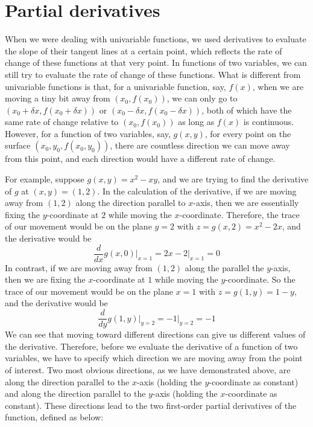 \section{Partial derivatives}
When we were dealing with univariable functions, we used derivatives to evaluate the slope of their tangent lines at a certain point, which reflects the rate of change of these functions at that very point.  In functions of two variables, we can still try to evaluate the rate of change of these functions.  What is different from univariable functions is that, for a univariable function, say, $f(x)$, when we are moving a tiny bit away from $(x_0, f(x_0))$, we can only go to $(x_0 + \delta x, f(x_0+ \delta x))$ or $(x_0 - \delta x, f(x_0 - \delta x))$, both of which have the same rate of change relative to $(x_0, f(x_0))$ as long as $f(x)$ is continuous.  However, for a function of two variables, say, $g(x,y)$, for every point on the surface $(x_0, y_0, f(x_0, y_0))$, there are countless direction we can move away from this point, and each direction would have a different rate of change.  

For example, suppose $g(x,y) = x^2 - xy$, and we are trying to find the derivative of $g$ at $(x,y) = (1,2)$.  In the calculation of the derivative, if we are moving away from $(1,2)$ along the direction parallel to $x$-axis, then we are essentially fixing the $y$-coordinate at $2$ while moving the $x$-coordinate.  Therefore, the trace of our movement would be on the plane $y=2$ with $z = g(x,2) = x^2 - 2x$, and the derivative would be 
\[\frac{d}{dx}g(x,0)\Big|_{x=1} = 2x-2|_{x=1} = 0\]
In contrast, if we are moving away from $(1,2)$ along the parallel the $y$-axis, then we are fixing the $x$-coordinate at $1$ while moving the $y$-coordinate.  So the trace of our movement would be on the plane $x=1$ with $z = g(1,y) = 1-y$, and the derivative would be
\[\frac{d}{dy}g(1,y)\Big|_{y=2} = -1|_{y=2} = -1\] 
We can see that moving toward different directions can give us different values of the derivative.  Therefore, before we evaluate the derivative of a function of two variables, we have to specify which direction we are moving away from the point of interest.  Two most obvious directions, as we have demonstrated above, are along the direction parallel to the $x$-axis (holding the $y$-coordinate as constant) and along the direction parallel to the $y$-axis (holding the $x$-coordinate as constant).  These directions lead to the two first-order partial derivatives of the function, defined as below:


